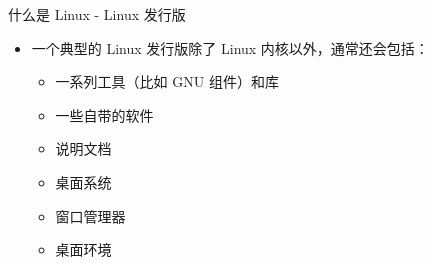 \documentclass[UTF8]{ctexbeamer}
\begin{document}
\begin{frame}{什么是 Linux - Linux 发行版}
    \begin{itemize}
        \item 一个典型的 Linux 发行版除了 Linux 内核以外，通常还会包括：
        \begin{itemize}
            \item 一系列工具（比如 GNU 组件）和库
            \item 一些自带的软件
            \item 说明文档
            \item 桌面系统
            \item 窗口管理器
            \item 桌面环境
        \end{itemize}
    \end{itemize}
    
\end{frame}
\end{document}
